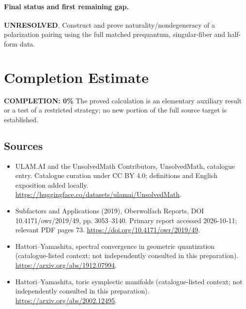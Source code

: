\documentclass[11pt]{article}
\begin{document}
\paragraph{Final status and first remaining gap.}
\textbf{UNRESOLVED}. Construct and prove naturality/nondegeneracy of a polarization pairing using the full matched prequantum, singular-fiber and half-form data.

\section{Completion Estimate}
\noindent\textbf{COMPLETION: 0\%}
The proved calculation is an elementary auxiliary result or a test of a restricted strategy; no new portion of the full source target is established.

\subsection{Sources}
\begin{itemize}
\item[\hypertarget{source:statement:1}{S1}] ULAM.AI and the UnsolvedMath Contributors, UnsolvedMath, catalogue entry. Catalogue curation under CC BY 4.0; definitions and English exposition added locally.
\url{https://huggingface.co/datasets/ulamai/UnsolvedMath}.
\item[\hypertarget{source:statement:2}{S2}] Subfactors and Applications (2019), Oberwolfach Reports, DOI 10.4171/owr/2019/49, pp. 3053--3140. Primary report accessed 2026-10-11; relevant PDF pages 73.
\url{https://doi.org/10.4171/owr/2019/49}.
\item[\hypertarget{source:statement:3}{S3}] Hattori--Yamashita, spectral convergence in geometric quantization (catalogue-listed context; not independently consulted in this preparation).
\url{https://arxiv.org/abs/1912.07994}.
\item[\hypertarget{source:statement:4}{S4}] Hattori--Yamashita, toric symplectic manifolds (catalogue-listed context; not independently consulted in this preparation).
\url{https://arxiv.org/abs/2002.12495}.
\end{itemize}
\label{end:statement}
\end{document}
